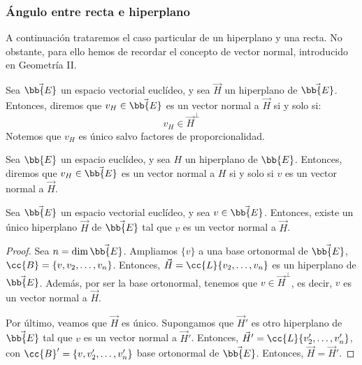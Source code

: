 \subsubsection{Ángulo entre recta e hiperplano}
A continuación trataremos el caso particular de un hiperplano y una recta. No obstante, para ello hemos de recordar el concepto de vector normal,
introducido en Geometría II.
\begin{definicion}
    Sea $\vec{\bb{E}}$ un espacio vectorial euclídeo, y sea $\vec{H}$ un hiperplano de $\vec{\bb{E}}$. Entonces, diremos que $v_H \in \vec{\bb{E}}$ es un vector normal a $\vec{H}$ si y solo si:
    \begin{equation*}
        v_H\in  \vec{H}^\perp
    \end{equation*}
    Notemos que $v_H$ es único salvo factores de proporcionalidad.
\end{definicion}
\begin{definicion}
    Sea $\bb{E}$ un espacio euclídeo, y sea $H$ un hiperplano de $\bb{E}$. Entonces, diremos que $v_H \in \vec{\bb{E}}$ es un vector normal a $H$ si y solo si $v$
    es un vector normal a $\vec{H}$.
\end{definicion}
\begin{prop}
    Sea $\vec{\bb{E}}$ un espacio vectorial euclídeo, y sea $v\in \vec{\bb{E}}$. Entonces, existe un único hiperplano $\vec{H}$ de $\vec{\bb{E}}$
    tal que $v$ es un vector normal a $\vec{H}$.
\end{prop}
\begin{proof}
    Sea $n=\dim \vec{\bb{E}}$. Ampliamos $\{v\}$ a una base ortonormal de $\vec{\bb{E}}$, $\cc{B}=\{v,v_2,\dots,v_n\}$.
    Entonces, $\vec{H}=\cc{L}\{v_2,\dots,v_n\}$ es un hiperplano de $\vec{\bb{E}}$. Además, por ser la base ortonormal, tenemos que $v\in \vec{H}^\perp$, es decir,
    $v$ es un vector normal a $\vec{H}$.

    Por último, veamos que $\vec{H}$ es único. Supongamos que $\vec{H}'$ es otro hiperplano de $\vec{\bb{E}}$ tal que $v$ es un vector normal a $\vec{H}'$.
    Entonces, $\vec{H}'=\cc{L}\{v_2',\dots,v_n'\}$, con $\cc{B}'=\{v,v_2',\dots,v_n'\}$ base ortonormal de $\vec{\bb{E}}$. Entonces, $\vec{H}=\vec{H}'$.
\end{proof}

